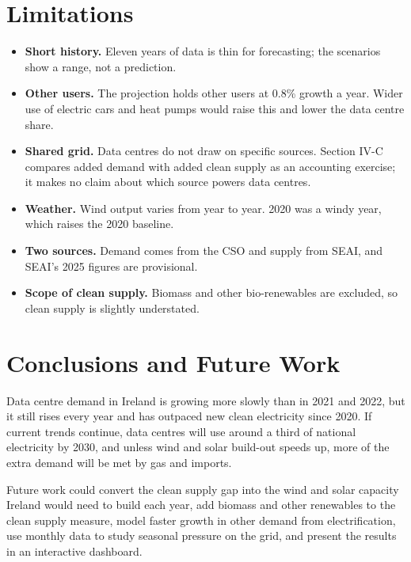 \documentclass[10pt,twocolumn,a4paper]{article}
\begin{document}
\section{Limitations}

\begin{itemize}
\item \textbf{Short history.} Eleven years of data is thin for forecasting; the scenarios show a range, not a prediction.
\item \textbf{Other users.} The projection holds other users at 0.8\% growth a year. Wider use of electric cars and heat pumps would raise this and lower the data centre share.
\item \textbf{Shared grid.} Data centres do not draw on specific sources. Section IV-C compares added demand with added clean supply as an accounting exercise; it makes no claim about which source powers data centres.
\item \textbf{Weather.} Wind output varies from year to year. 2020 was a windy year, which raises the 2020 baseline.
\item \textbf{Two sources.} Demand comes from the CSO and supply from SEAI, and SEAI's 2025 figures are provisional.
\item \textbf{Scope of clean supply.} Biomass and other bio-renewables are excluded, so clean supply is slightly understated.
\end{itemize}

\section{Conclusions and Future Work}

Data centre demand in Ireland is growing more slowly than in 2021 and 2022, but it still rises every year and has outpaced new clean electricity since 2020. If current trends continue, data centres will use around a third of national electricity by 2030, and unless wind and solar build-out speeds up, more of the extra demand will be met by gas and imports.

Future work could convert the clean supply gap into the wind and solar capacity Ireland would need to build each year, add biomass and other renewables to the clean supply measure, model faster growth in other demand from electrification, use monthly data to study seasonal pressure on the grid, and present the results in an interactive dashboard.
\end{document}
